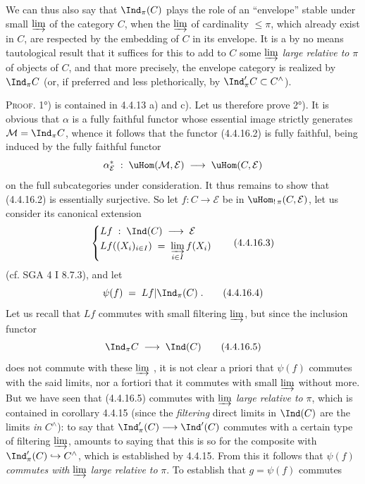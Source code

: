 We can thus also say that $\Ind_\pi(C)$ plays the role of an ``envelope'' stable under small $\varinjlim$ of the category $C$, when the $\varinjlim$ of cardinality $\leqslant\pi$, which already exist in $C$, are respected by the embedding of $C$ in its envelope. It is a by no means tautological result that it suffices for this to add to $C$ some $\varinjlim$ \textit{large relative to} $\pi$ of objects of $C$, and that more precisely, the envelope category is realized by $\Ind_\pi C$ (or, if preferred and less plethorically, by $\Ind'_\pi C\subset C^\wedge$). %

\textsc{Proof}. 1°) is contained in 4.4.13 a) and c). Let us therefore prove 2°). It is obvious that $\alpha$ is a fully faithful functor whose essential image strictly generates
$\mathcal{M}=\Ind_\pi C$, whence it follows that the functor (4.4.16.2) is fully faithful, being induced by the fully faithful functor
\[
\alpha^*_{\mathcal{E}}\;:\;\uHom(\mathcal{M},\mathcal{E})\;\longrightarrow\;\uHom(C,\mathcal{E})
\]
on the full subcategories under consideration. It thus remains to show that (4.4.16.2) is essentially surjective. So let $f:C\longrightarrow\mathcal{E}$ be in $\uHom_{!\,\pi}(C,\mathcal{E})$, let us consider its canonical extension %
\[
\left\{
\begin{aligned}
&Lf\;:\;\Ind(C)\;\longrightarrow\;\mathcal{E}\\
&Lf((X_i)_{i\in I})\;=\;\varinjlim_{i\in I}f(X_i)
\end{aligned}
\right.
\tag*{(4.4.16.3)}
\]
(cf. SGA 4 I 8.7.3), and let
\[
\psi(f)\;=\;Lf|\Ind_\pi(C)\;. \tag*{(4.4.16.4)}
\]
Let us recall that $Lf$ commutes with small filtering $\varinjlim$, but since the inclusion functor
\[
\Ind_\pi C\;\longrightarrow\;\Ind(C) \tag*{(4.4.16.5)}
\]
does not commute with these $\varinjlim$ , it is not clear a priori that $\psi(f)$ commutes with the said limits, nor a fortiori that it commutes with small $\varinjlim$ without more. But we have seen that (4.4.16.5) commutes with $\varinjlim$ \textit{large relative to} $\pi$, which is contained in corollary 4.4.15 (since the \textit{filtering} direct limits in $\Ind(C)$ are the limits \textit{in} $C^\wedge$): to say that $\Ind'_\pi(C)\longrightarrow\Ind'(C)$ commutes with a certain type of filtering $\varinjlim$, amounts to saying that this is so for the composite with $\Ind'_\pi(C)\hookrightarrow C^\wedge$, which is established by 4.4.15. From this it follows that $\psi(f)$ \textit{commutes with} $\varinjlim$ \textit{large relative to} $\pi$. To establish that $g=\psi(f)$ commutes
